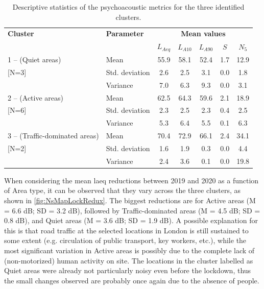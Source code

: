 \begin{table}[!h]
  \centering
  \caption{Descriptive statistics of the psychoacoustic metrics for the three identified clusters. \label{tab:NsMapLockClust}}
    \begin{tabular}{llccccc}
      \toprule
      \textbf{Cluster} & \textbf{Parameter} & \multicolumn{5}{c}{\textbf{Mean values }}     \\
      \cline{3-7}      &                    & $L_{Aeq}$ & $L_{A10}$ & $L_{A90}$ & $S$ & $N_5$ \\
      \hline
      1 -- (Quiet areas)  & Mean            & 55.9      & 58.1      & 52.4      & 1.7 & 12.9 \\
      {[}N=3]             & Std. deviation  & 2.6       & 2.5       & 3.1       & 0.0 & 1.8  \\
                          & Variance        & 7.0       & 6.3       & 9.3       & 0.0 & 3.1  \\
      \hline
      2 -- (Active areas) & Mean            & 62.5      & 64.3      & 59.6      & 2.1 & 18.9 \\
      {[}N=6]             & Std. deviation  & 2.3       & 2.5       & 2.3       & 0.4 & 2.5  \\
                          & Variance        & 5.3       & 6.4       & 5.5       & 0.1 & 6.3  \\
      \hline
      3 -- (Traffic-dominated areas) & Mean & 70.4      & 72.9      & 66.1      & 2.4 & 34.1 \\
      {[}N=2]             & Std. deviation  & 1.6       & 1.9       & 0.3       & 0.0 & 4.4  \\
                          & Variance        & 2.4       & 3.6       & 0.1       & 0.0 & 19.8 \\
      \bottomrule
    \end{tabular}

\end{table}

When considering the mean \gls{laeq} reductions between 2019 and 2020 as a function of Area type, it can be observed that they vary across the three clusters, as shown in \cref{fig:NsMapLockRedux}. The biggest reductions are for Active areas (M = 6.6 dB; SD = 3.2 dB), followed by Traffic-dominated areas (M = 4.5 dB; SD = 0.8 dB), and Quiet areas (M = 3.6 dB; SD = 1.9 dB). A possible explanation for this is that road traffic at the selected locations in London is still sustained to some extent (e.g. circulation of public transport, key workers, etc.), while the most significant variation in Active areas is possibly due to the complete lack of (non-motorized) human activity on site. The locations in the cluster labelled as Quiet areas were already not particularly noisy even before the lockdown, thus the small changes observed are probably once again due to the absence of people.

